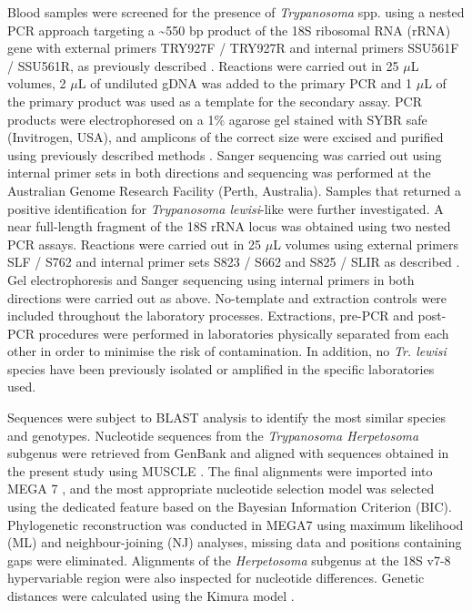 \documentclass[a4paper, nobind]{templates/ociamthesis}
\begin{document}
Blood samples were screened for the presence of \emph{Trypanosoma} spp. using a nested PCR approach targeting a \textasciitilde550 bp product of the 18S ribosomal RNA (rRNA) gene with external primers TRY927F / TRY927R and internal primers SSU561F / SSU561R, as previously described \autocite{noyesNestedPCRSsrRNA1999}. Reactions were carried out in 25 \(\mu\)L volumes, 2 \(\mu\)L of undiluted gDNA was added to the primary PCR and 1 \(\mu\)L of the primary product was used as a template for the secondary assay. PCR products were electrophoresed on a 1\% agarose gel stained with SYBR safe (Invitrogen, USA), and amplicons of the correct size were excised and purified using previously described methods \autocite{yangSpecificQuantitativeDetection2013}. Sanger sequencing was carried out using internal primer sets in both directions and sequencing was performed at the Australian Genome Research Facility (Perth, Australia). Samples that returned a positive identification for \emph{Trypanosoma lewisi}-like were further investigated. A near full-length fragment of the 18S rRNA locus was obtained using two nested PCR assays. Reactions were carried out in 25 \(\mu\)L volumes using external primers SLF / S762 and internal primer sets S823 / S662 and S825 / SLIR as described \autocite{mcinnesTrypanosomaIrwiniSp2009}. Gel electrophoresis and Sanger sequencing using internal primers in both directions were carried out as above. No-template and extraction controls were included throughout the laboratory processes. Extractions, pre-PCR and post-PCR procedures were performed in laboratories physically separated from each other in order to minimise the risk of contamination. In addition, no \emph{Tr. lewisi} species have been previously isolated or amplified in the specific laboratories used.

Sequences were subject to BLAST analysis to identify the most similar species and genotypes. Nucleotide sequences from the \emph{Trypanosoma Herpetosoma} subgenus were retrieved from GenBank \autocite{bensonGenBank2017} and aligned with sequences obtained in the present study using MUSCLE \autocite{edgarMUSCLEMultipleSequence2004}. The final alignments were imported into MEGA 7 \autocite{kumarMEGA7MolecularEvolutionary2016}, and the most appropriate nucleotide selection model was selected using the dedicated feature based on the Bayesian Information Criterion (BIC). Phylogenetic reconstruction was conducted in MEGA7 using maximum likelihood (ML) and neighbour-joining (NJ) analyses, missing data and positions containing gaps were eliminated. Alignments of the \emph{Herpetosoma} subgenus at the 18S v7-8 hypervariable region were also inspected for nucleotide differences. Genetic distances were calculated using the Kimura model \autocite{edgarMUSCLEMultipleSequence2004}.
\end{document}
